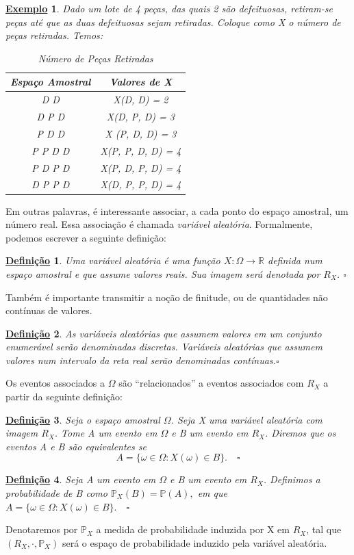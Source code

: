 \documentclass{article}
\newtheorem*{def*}{\underline{Defini\c c\~ao}}
\newtheorem{example}{\underline{Exemplo}}
\begin{document}
\begin{example}
  Dado um lote de 4 peças, das quais 2 são defeituosas, retiram-se peças até que as duas defeituosas
sejam retiradas. Coloque como X o número de peças retiradas. Temos:
\begin{center}
  \begin{table}[h]
  \caption{Número de Peças Retiradas}
  \centering
    \begin{tabular}{| c | c |}
      \hline
      Espaço Amostral & Valores de X\\
      \hline
      D D & X(D, D) = 2\\
      D P D & X(D, P, D) = 3\\
      P D D & X (P, D, D) = 3\\
      P P D D & X(P, P, D, D) = 4\\
      P D P D & X(P, D, P, D) = 4\\
      D P P D & X(D, P, P, D) = 4\\
      \hline
    \end{tabular}
  \end{table}
\end{center}
\end{example}
  Em outras palavras, é interessante associar, a cada ponto do espaço amostral, um número real. Essa associação é
chamada \textit{variável aleatória}. Formalmente, podemos escrever a seguinte definição:
\begin{def*}
  Uma variável aleatória é uma função \(X:\Omega \rightarrow \mathbb{R}\) definida num espaço amostral e que assume valores reais.
Sua imagem será denotada por \(R_{X}\). \(\square\)
\end{def*}
  Também é importante transmitir a noção de finitude, ou de quantidades não contínuas de valores.
 \begin{def*}
   As variáveis aleatórias que assumem valores em um conjunto enumerável serão denominadas discretas. Variáveis aleatórias que assumem valores
num intervalo da reta real serão denominadas contínuas.\(\square\)
 \end{def*}
  Os eventos associados a \(\Omega \) são ``relacionados'' a eventos associados com \(R_{X}\) a partir 
da seguinte definição:
\begin{def*}
  Seja o espaço amostral \(\Omega \). Seja X uma variável aleatória com imagem \(R_{X}\). Tome A
um evento em \(\Omega \) e B um evento em \(R_{X}\). Diremos que os eventos A e B são equivalentes se 
  \[
    A = \{\omega \in \Omega : X(\omega )\in B\}.\quad\square
  \]
\end{def*}
\begin{def*}
  Seja A um evento em \(\Omega \) e B um evento em \(R_{X}\). Definimos a probabilidade de B como
 \(\mathbb{P}_{X}(B) = \mathbb{P}(A),\) em que \(A = \{\omega \in \Omega : X(\omega )\in B\}.\quad\square\)
\end{def*}
  Denotaremos por \(\mathbb{P}_{X}\) a medida de probabilidade induzida por X em \(R_{X}\), tal que \((R_{X}, \cdot , \mathbb{P}_{X})\) será o espaço
de probabilidade induzido pela variável aleatória.
\end{document}
